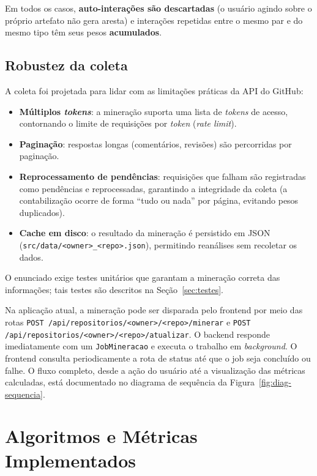\documentclass[12pt]{article}
\begin{document}
Em todos os casos, \textbf{auto-interações são descartadas} (o usuário agindo
sobre o próprio artefato não gera aresta) e interações repetidas entre o mesmo
par e do mesmo tipo têm seus pesos \textbf{acumulados}.

\subsection{Robustez da coleta}

A coleta foi projetada para lidar com as limitações práticas da API do GitHub:

\begin{itemize}
  \item \textbf{Múltiplos \emph{tokens}}: a mineração suporta uma lista de
        \emph{tokens} de acesso, contornando o limite de requisições por
        \emph{token} (\emph{rate limit}).
  \item \textbf{Paginação}: respostas longas (comentários, revisões) são
        percorridas por paginação.
  \item \textbf{Reprocessamento de pendências}: requisições que falham são
        registradas como pendências e reprocessadas, garantindo a integridade da
        coleta (a contabilização ocorre de forma ``tudo ou nada'' por página,
        evitando pesos duplicados).
  \item \textbf{Cache em disco}: o resultado da mineração é persistido em JSON
        (\texttt{src/data/<owner>\_<repo>.json}), permitindo reanálises sem
        recoletar os dados.
\end{itemize}

O enunciado exige testes unitários que garantam a mineração correta das
informações; tais testes são descritos na Seção~\ref{sec:testes}.

Na aplicação atual, a mineração pode ser disparada pelo frontend por meio das
rotas \texttt{POST /api/repositorios/<owner>/<repo>/minerar} e
\texttt{POST /api/repositorios/<owner>/<repo>/atualizar}. O backend responde
imediatamente com um \texttt{JobMineracao} e executa o trabalho em
\emph{background}. O frontend consulta periodicamente a rota de status até que o
job seja concluído ou falhe. O fluxo completo, desde a ação do usuário até a
visualização das métricas calculadas, está documentado no diagrama de sequência da
Figura~\ref{fig:diag-sequencia}.

\section{Algoritmos e Métricas Implementados}
\label{sec:metricas}
\end{document}
